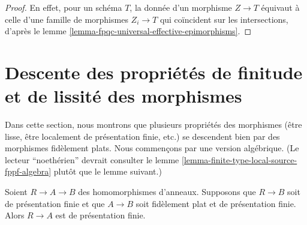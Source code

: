 \begin{proof}
En effet, pour un schéma $T$, la donnée d'un morphisme $Z \to T$ équivaut à
celle d'une famille de morphismes $Z_i \to T$ qui coïncident sur les
intersections, d'après le lemme
\ref{lemma-fpqc-universal-effective-epimorphisms}.
\end{proof}















\section[Descente : finitude et lissité]{Descente des propriétés de finitude et de lissité des morphismes}
\label{section-descent-finiteness-morphisms}

\noindent
Dans cette section, nous montrons que plusieurs propriétés des morphismes
(être lisse, être localement de présentation finie, etc.) se descendent bien
par des morphismes fidèlement plats. Nous commençons par une version algébrique.
(Le lecteur ``noethérien'' devrait consulter le lemme
\ref{lemma-finite-type-local-source-fppf-algebra} plutôt que le lemme suivant.)

\begin{lemma}
\label{lemma-flat-finitely-presented-permanence-algebra}
Soient $R \to A \to B$ des homomorphismes d'anneaux.
Supposons que $R \to B$ soit de présentation finie et que $A \to B$ soit
fidèlement plat et de présentation finie. Alors $R \to A$ est de présentation
finie.
\end{lemma}

